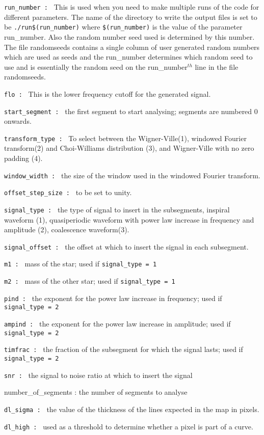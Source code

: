 \begin{description}
\item{\tt run\_number : } This is used when you need to make multiple runs
of the code for different parameters. The name of the directory to
write the output files is set to be {\tt ./run\$(run\_number)} where
{\tt \$(run\_number)} is the value of the parameter  run\_number. Also the 
random number seed used is determined by this number. The file
randomseeds contains a single column of user generated random numbers
which are used as seeds and the run\_number determines which random
seed to use and is essentially the random seed on the
run\_number$^{th}$ line in the file randomseeds.
\item{\tt flo : } This is the lower frequency cutoff for the generated
signal.
\item{\tt start\_segment : } the first segment to start analysing; segments
are numbered 0 onwards.
\item{\tt transform\_type : } To select between the Wigner-Ville(1), windowed
Fourier transform(2)  and Choi-Williams distribution (3), and
Wigner-Ville with no zero padding (4).
\item{\tt window\_width : } the size of the window used in the windowed
Fourier transform.
\item{\tt offset\_step\_size : } to be set to unity.
\item{\tt signal\_type : } the type of signal to insert in the
subsegments, inspiral waveform (1), quasiperiodic waveform with power
law increase in frequency and amplitude (2), coalescence waveform(3).
\item{\tt signal\_offset : } the offset at which to insert the signal in
each subsegment.
\item{\tt m1 : } mass of the star; used if  {\tt signal\_type  = 1}
\item{\tt m2 : } mass of the other star; used if  {\tt signal\_type  = 1}
\item{\tt pind : } the exponent for the power law increase in frequency;
used if {\tt signal\_type  = 2}
\item{\tt ampind : } the exponent for the power law increase in amplitude;
used if {\tt signal\_type  = 2}
\item{\tt timfrac : } the fraction of the subsegment for which the signal lasts;
used if {\tt signal\_type  = 2}
\item{\tt snr : } the signal to noise ratio at which to insert the signal
\item{number\_of\_segments : } the number of segments to analyse
\item{\tt dl\_sigma : } the value of the thickness of the lines expected
in the map in pixels.
\item{\tt dl\_high : } used as a threshold to determine whether a pixel is
part of a curve.
\end{description} 

